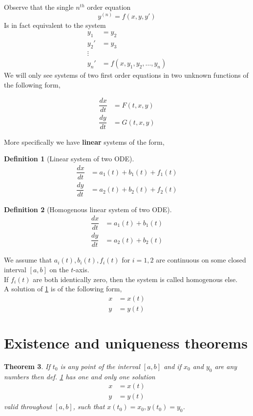 \documentclass[oneside,11pt,pdftex,final]{book}%
\numberwithin{equation}{section}
\newtheorem{theorem}{Theorem}[chapter]%
\newtheorem{definition}[theorem]{Definition}
\numberwithin{section}{chapter}
\numberwithin{equation}{chapter}
\begin{document}
Observe that the single $ n^{th} $ order equation \[ y^{(n)}=f(x,y,y') \]
Is in fact equivalent to the system 
\begin{align*}
	y_1&=y_2\\
	y_2'&=y_3\\
	\vdots &\\
	y_n'&=f(x,y_1,y_2,\dots,y_n)
\end{align*}
We will only see systems of two first order equations in two unknown functions of the following form,

\begin{align*}
	\dfrac{dx}{dt}&=F(t,x,y)\\
	\dfrac{dy}{dt}&=G(t,x,y)
\end{align*}


More specifically we have \textbf{linear} systems of the form,

\begin{definition}[Linear system of two ODE]\label{def:syslinear}
	\begin{align*}
		\dfrac{dx}{dt}&=a_1(t)+b_1(t)+f_1(t)\\
		\dfrac{dy}{dt}&=a_2(t)+b_2(t)+f_2(t)
	\end{align*} 
\end{definition}


\begin{definition}[Homogenous linear system of two ODE]\label{def:homosyslinear}
	\begin{align*}
		\dfrac{dx}{dt}&=a_1(t)+b_1(t)\\
		\dfrac{dy}{dt}&=a_2(t)+b_2(t)
	\end{align*} 
\end{definition}


We assume that $ a_i(t),b_i(t),f_i(t) $ for $ i=1,2 $ are continuous on some closed interval $ [a,b] $ on the $ t$-axis.\\
If $ f_i(t) $ are both identically zero, then the system is called homogenous else.
\\
A solution of \ref{def:syslinear} is of the following form,
\begin{align*}
	x&=x(t)\\
	y&=y(t)
\end{align*}



\section{Existence and uniqueness theorems}
\begin{theorem}
	If $ t_0 $ is any point of the interval $ [a,b] $ and if $ x_0 $ and $ y_0 $ are any numbers then def. \ref{def:syslinear} has one and only one solution 
	\begin{align*}
		x&=x(t)\\
		y&=y(t)
	\end{align*}
valid throughout $ [a,b] $, such that $ x(t_0)=x_0, y(t_0)=y_0 $.
\end{theorem}
\end{document}
